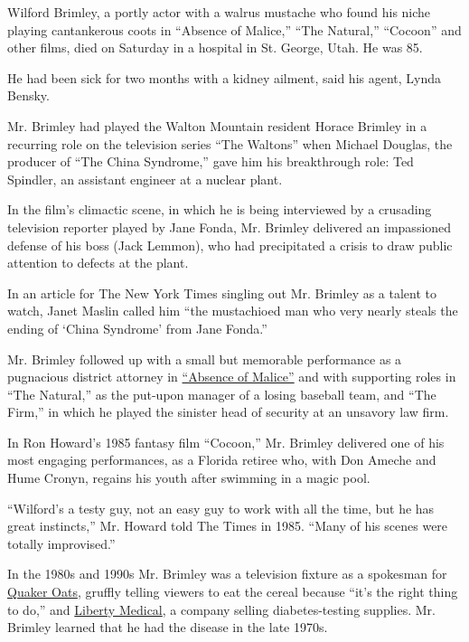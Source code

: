 Wilford Brimley, a portly actor with a walrus mustache who found his
niche playing cantankerous coots in ``Absence of Malice,'' ``The
Natural,'' ``Cocoon'' and other films, died on Saturday in a hospital in
St. George, Utah. He was 85.

He had been sick for two months with a kidney ailment, said his agent,
Lynda Bensky.

Mr. Brimley had played the Walton Mountain resident Horace Brimley in a
recurring role on the television series ``The Waltons'' when Michael
Douglas, the producer of ``The China Syndrome,'' gave him his
breakthrough role: Ted Spindler, an assistant engineer at a nuclear
plant.

In the film's climactic scene, in which he is being interviewed by a
crusading television reporter played by Jane Fonda, Mr. Brimley
delivered an impassioned defense of his boss (Jack Lemmon), who had
precipitated a crisis to draw public attention to defects at the plant.

In an article for The New York Times singling out Mr. Brimley as a
talent to watch, Janet Maslin called him ``the mustachioed man who very
nearly steals the ending of `China Syndrome' from Jane Fonda.''

Mr. Brimley followed up with a small but memorable performance as a
pugnacious district attorney in
\href{https://www.youtube.com/watch?v=btqBJJF2yvE}{``Absence of
Malice''} and with supporting roles in ``The Natural,'' as the put-upon
manager of a losing baseball team, and ``The Firm,'' in which he played
the sinister head of security at an unsavory law firm.

In Ron Howard's 1985 fantasy film ``Cocoon,'' Mr. Brimley delivered one
of his most engaging performances, as a Florida retiree who, with Don
Ameche and Hume Cronyn, regains his youth after swimming in a magic
pool.

``Wilford's a testy guy, not an easy guy to work with all the time, but
he has great instincts,'' Mr. Howard told The Times in 1985. ``Many of
his scenes were totally improvised.''

In the 1980s and 1990s Mr. Brimley was a television fixture as a
spokesman for \href{https://www.youtube.com/watch?v=GOLXnkbfEuo}{Quaker
Oats}, gruffly telling viewers to eat the cereal because ``it's the
right thing to do,'' and
\href{https://www.youtube.com/watch?v=1K93EPoO7is}{Liberty Medical}, a
company selling diabetes-testing supplies. Mr. Brimley learned that he
had the disease in the late 1970s.

